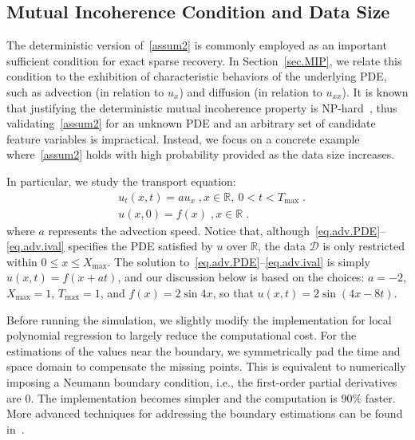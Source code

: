 \documentclass[a4paper,11pt]{article}
\begin{document}
\subsection{Mutual Incoherence Condition and Data Size}
The deterministic version of~\eqref{assum2} is commonly employed as an important sufficient condition for exact sparse recovery. In Section~\ref{sec.MIP}, we relate this condition to the exhibition of characteristic behaviors of the underlying PDE, such as advection (in relation to $u_x$) and diffusion (in relation to $u_{xx}$). It is known that justifying the deterministic mutual incoherence property is NP-hard~\cite{tillmann2013computational}, thus validating~\eqref{assum2} for an unknown PDE and an arbitrary set of candidate feature variables is  impractical. Instead, we focus on a  concrete example where~\eqref{assum2} holds with high probability provided as the data size increases.

In particular, we study the transport equation:
\begin{align}
&u_t(x,t) = au_x\;,x\in\mathbb{R},~0<t<T_{\max}\;.\label{eq.adv.PDE}\\
&u(x,0)=f(x)\;, x\in\mathbb{R}\;.\label{eq.adv.ival}
\end{align}
where $a$ represents the advection speed. Notice that, although~\eqref{eq.adv.PDE}--\eqref{eq.adv.ival} specifies the PDE satisfied by $u$ over $\mathbb{R}$, the data $\mathcal{D}$ is only restricted within $0\leq x\leq X_{\max}$.  The solution to~\eqref{eq.adv.PDE}--\eqref{eq.adv.ival} is simply $u(x,t)=f(x+at)$, and our discussion below is based on the choices: $a=-2$, $X_{\max}=1$, $T_{\max}=1$, and $f(x)=2\sin 4x$, so that $u(x,t)=2\sin(4x-8t)$.

Before running the simulation, we slightly modify the implementation for local polynomial regression to largely reduce the computational cost. For the estimations of the values near the boundary, we symmetrically pad the time and space domain to compensate the missing points. This is equivalent to numerically imposing a Neumann boundary condition, i.e., the first-order partial derivatives are $0$. The implementation becomes simpler and the computation is $90\%$ faster.  More advanced techniques for addressing the boundary estimations can be found in~\cite{cheng1997automatic,hastie1993local}. 
\end{document}
